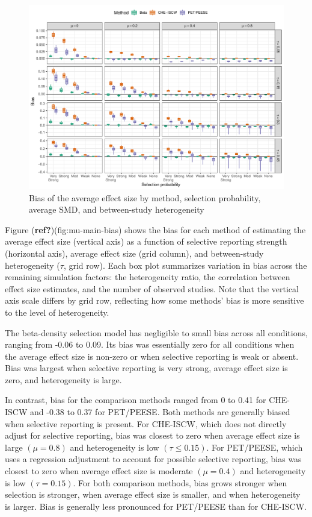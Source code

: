 \documentclass[
  american,
  man, donotrepeattitle,floatsintext]{apa7}
\begin{document}
\begin{figure}
\includegraphics{beta-function-selection-models-with-dependent-effects_files/figure-latex/mu-bias-main-1} \caption{Bias of the average effect size by method, selection probability, average SMD, and between-study heterogeneity}\label{fig:mu-bias-main}
\end{figure}

Figure (\textbf{ref?})(fig:mu-main-bias) shows the bias for each method of estimating the average effect size (vertical axis) as a function of selective reporting strength (horizontal axis), average effect size (grid column), and between-study heterogeneity (\(\tau\), grid row). Each box plot summarizes variation in bias across the remaining simulation factors: the heterogeneity ratio, the correlation between effect size estimates, and the number of observed studies. Note that the vertical axis scale differs by grid row, reflecting how some methods' bias is more sensitive to the level of heterogeneity.

The beta-density selection model has negligible to small bias across all conditions, ranging from -0.06 to 0.09. Its bias was essentially zero for all conditions when the average effect size is non-zero or when selective reporting is weak or absent. Bias was largest when selective reporting is very strong, average effect size is zero, and heterogeneity is large.

In contrast, bias for the comparison methods ranged from 0 to 0.41 for CHE-ISCW and -0.38 to 0.37 for PET/PEESE. Both methods are generally biased when selective reporting is present.
For CHE-ISCW, which does not directly adjust for selective reporting, bias was closest to zero when average effect size is large \((\mu = 0.8)\) and heterogeneity is low \((\tau \leq 0.15)\).
For PET/PEESE, which uses a regression adjustment to account for possible selective reporting, bias was closest to zero when average effect size is moderate \((\mu = 0.4)\) and heterogeneity is low \((\tau = 0.15)\).
For both comparison methods, bias grows stronger when selection is stronger, when average effect size is smaller, and when heterogeneity is larger.
Bias is generally less pronounced for PET/PEESE than for CHE-ISCW.
\end{document}
